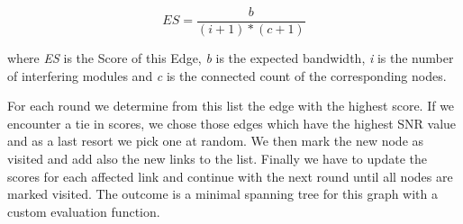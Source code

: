 	\begin{equation} \label{eq:edgescore}
	  ES=\frac{b}{(i + 1 )* (c + 1)}
	\end{equation}
	
	where \textit{ES} is the Score of this Edge, \textit{b} is the expected bandwidth, \textit{i} is the number of 
	interfering modules and \textit{c} is the connected count of the corresponding nodes.
	
	For each round we determine from this list the edge with the highest score. If we encounter a tie in scores, 
	we chose those edges which have the highest SNR value and as a last
	resort we pick one at random. We then mark the new node as visited and add also the new links to the list.
	Finally we have to update the scores for each affected link and continue with the next round until all nodes are marked visited.
	The outcome is a minimal spanning tree for this graph with a custom evaluation function.
	
	\newpage
	
